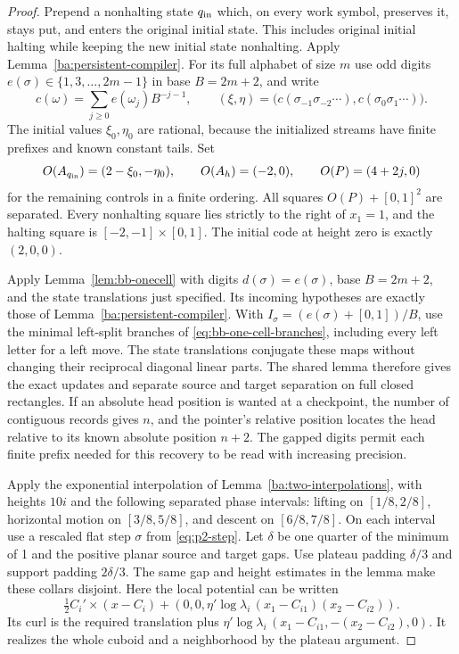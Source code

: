 \begin{proof}\label{ba:periodic-entry-proof}
Prepend a nonhalting state $q_{\rm in}$ which, on every work symbol,
preserves it, stays put, and enters the original initial state.  This
includes original initial halting while keeping the new initial state
nonhalting.  Apply Lemma~\ref{ba:persistent-compiler}.  For its full
alphabet of size $m$ use odd digits $e(\sigma)\in\{1,3,\ldots,2m-1\}$
in base $B=2m+2$, and write
\[
 c(\omega)=\sum_{j\ge0}e(\omega_j)B^{-j-1},\qquad
 (\xi,\eta)=
 \big(c(\sigma_{-1}\sigma_{-2}\cdots),
       c(\sigma_0\sigma_1\cdots)\big).
\]
The initial values $\xi_0,\eta_0$ are rational, because the initialized
streams have finite prefixes and known constant tails.  Set
\[
 O(A_{q_{\rm in}})=(2-\xi_0,-\eta_0),\qquad
 O(A_h)=(-2,0),\qquad O(P)=(4+2j,0)
\]
for the remaining controls in a finite ordering.  All squares
$O(P)+[0,1]^2$ are separated.  Every nonhalting square lies strictly
to the right of $x_1=1$, and the halting square is
$[-2,-1]\times[0,1]$.  The initial code at height zero is exactly
$(2,0,0)$.

Apply Lemma~\ref{lem:bb-onecell} with digits $d(\sigma)=e(\sigma)$,
base $B=2m+2$, and the state translations just specified.  Its incoming
hypotheses are exactly those of Lemma~\ref{ba:persistent-compiler}.
With $I_\sigma=(e(\sigma)+[0,1])/B$, use the minimal left-split
branches of \eqref{eq:bb-one-cell-branches}, including every left
letter for a left move.  The state translations conjugate these maps
without changing their reciprocal diagonal linear parts.  The shared
lemma therefore gives the exact updates and separate source and target
separation on full closed rectangles.  If an absolute head position is wanted at a checkpoint,
the number of contiguous records gives $n$, and the pointer's relative
position locates the head relative to its known absolute position $n+2$.
The gapped digits permit each finite prefix needed for this recovery
to be read with increasing precision.

Apply the exponential interpolation of
Lemma~\ref{ba:two-interpolations}, with heights $10i$ and the following
separated phase intervals: lifting on $[1/8,2/8]$, horizontal motion
on $[3/8,5/8]$, and descent on $[6/8,7/8]$.  On each interval use a
rescaled flat step $\sigma$ from \eqref{eq:p2-step}.
Let $\delta$ be one quarter of the minimum of 1
and the positive planar source and target gaps.  Use plateau padding
$\delta/3$ and support padding $2\delta/3$.  The same gap and height
estimates in the lemma make these collars disjoint.  Here the local
potential can be written
\[
 \tfrac12 C_i'\times(x-C_i)
 +(0,0,\eta'\log\lambda_i\,(x_1-C_{i1})(x_2-C_{i2})).
\]
Its curl is the required translation plus
$\eta'\log\lambda_i\,(x_1-C_{i1},-(x_2-C_{i2}),0)$.
It realizes the whole cuboid and a neighborhood by the plateau argument.


\end{proof}
